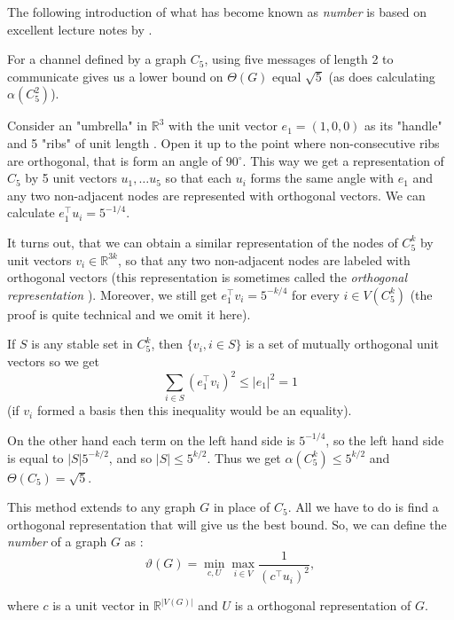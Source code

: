 The following introduction of what has become known as \emph{\Lovasz number} is based on excellent lecture notes by \Lovasz \cite{Lovasz95}. 

For a channel defined by a graph $C_5$, using five messages of length 2 to communicate gives us a lower bound on $\Theta(G)$ equal $\sqrt{5}$ (as does calculating $\alpha(C_5^2)$).

Consider an "umbrella" in $\mathbb{R}^3$ with the unit vector $e_1 = (1, 0, 0)$ as its "handle" and 5 "ribs" of unit length . Open it up to the point where non-consecutive ribs are orthogonal, that is form an angle of 90$^\circ$. This way we get a representation of $C_5$ by 5 unit vectors $u_1, \ldots u_5$ so that each $u_i$ forms the same angle with $e_1$ and any two non-adjacent nodes are represented with orthogonal vectors. We can calculate $e_1^\intercal u_i = 5 ^ {-1/4}$.

It turns out, that we can obtain a similar representation of the nodes of $C_5^k$ by unit vectors $v_i \in \mathbb{R}^{3k}$, so that any two non-adjacent nodes are labeled with orthogonal vectors (this representation is sometimes called the \emph{orthogonal representation} \cite{Lovsz1989Orthogonal}). Moreover, we still get $e_1^\intercal v_i = 5^{-k/4}$ for every $i \in V(C_5^k)$ (the proof is quite technical and we omit it here).

If $S$ is any stable set in $C_5^k$, then $\{v_i, i \in S\}$ is a set of mutually orthogonal unit vectors so we get 
$$\sum\limits_{i\in S}(e_1^\intercal v_i)^2 \leq |e_1|^2 = 1$$ 
(if $v_i$ formed a basis then this inequality would be an equality).

On the other hand each term on the left hand side is $5^{-1/4}$, so the left hand side is equal to $|S|5^{-k/2}$, and so $|S| \leq 5^{k/2}$. Thus we get $\alpha(C_5^k) \leq 5 ^{k/2}$ and $\Theta(C_5) = \sqrt{5}$.

This method extends to any graph $G$ in place of $C_5$. All we have to do is find a orthogonal representation that will give us the best bound. So, we can define the \emph{\Lovasz number} of a graph $G$ as : 
$$\vartheta(G) = \min\limits_{c,U} \max\limits_{i\in V} \frac{1}{(c^\intercal u_i)^2},$$

where $c$ is a unit vector in $\mathbb{R}^{|V(G)|}$ and $U$ is a orthogonal representation of $G$. 

